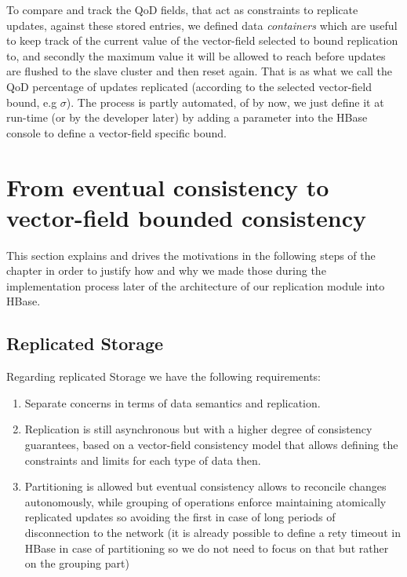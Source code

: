 To compare and track the QoD fields, that act as constraints to replicate updates, against these stored entries, we defined data \emph{containers} which are useful to keep track of the current value of the vector-field selected to bound replication to, and secondly the maximum value it will be allowed to reach before updates are flushed to the slave cluster and then reset again. That is as what we call the QoD percentage of updates replicated (according to the selected vector-field bound, e.g $\sigma$). The process is partly automated, of by now, we just define it at run-time (or by the developer later) by adding a parameter into the HBase console to define a vector-field specific bound.

\section{From eventual consistency to vector-field bounded consistency}\label{architecture:requirements}
This section explains and drives the motivations in the following steps of the chapter in order to justify how and why we made those during the implementation process later of the architecture of our replication module into HBase.

\subsection{Replicated Storage}
Regarding replicated Storage we have the following requirements: 

\begin{enumerate}
\item Separate concerns in terms of data semantics and replication.
\item Replication is still asynchronous but with a higher degree of consistency guarantees, based on a vector-field consistency model that allows defining the constraints and limits for each type of data then.
\item Partitioning is allowed but eventual consistency allows to reconcile changes autonomously, while grouping of operations enforce maintaining atomically replicated updates so avoiding the first in case of long periods of disconnection to the network (it is already possible to define a rety timeout in HBase in case of partitioning so we do not need to focus on that but rather on the grouping part)
\end{enumerate}

